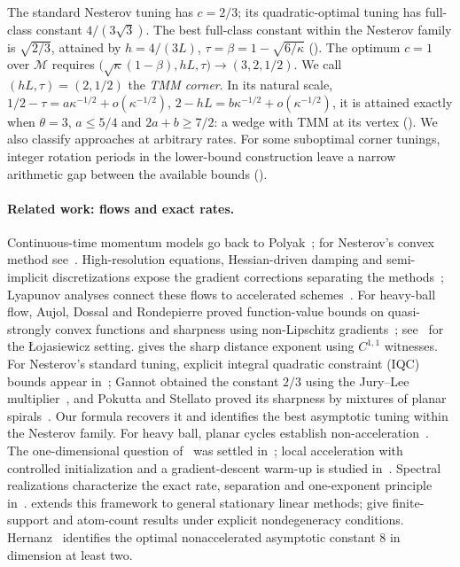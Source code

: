 \documentclass[11pt]{article}
\theoremstyle{definition}
\theoremstyle{remark}
\newcommand{\cM}{\mathcal M}
\begin{document}
The standard Nesterov tuning has \(c=2/3\); its quadratic-optimal tuning has
full-class constant \(4/(3\sqrt3)\).  The best full-class constant within the
Nesterov family is \(\sqrt{2/3}\), attained by
\(h=4/(3L)\), \(\tau=\beta=1-\sqrt{6/\kappa}\)
().
The optimum \(c=1\) over \(\cM\) requires
\(\bigl(\sqrt\kappa(1-\beta),hL,\tau\bigr)\to(3,2,1/2)\).
We call \((hL,\tau)=(2,1/2)\) the \emph{TMM corner}.  In its natural scale,
\(1/2-\tau=a\kappa^{-1/2}+o(\kappa^{-1/2})\),
\(2-hL=b\kappa^{-1/2}+o(\kappa^{-1/2})\), it is attained exactly when
\(\theta=3\), \(a\le5/4\) and \(2a+b\ge7/2\): a wedge with TMM at its
vertex ().  We also classify approaches at arbitrary rates.
For some suboptimal corner tunings, integer rotation periods in the lower-bound construction
leave a narrow arithmetic gap between the available bounds
().

\paragraph{Related work: flows and exact rates.}
Continuous-time momentum models go back to Polyak~\cite{Polyak1964};
for Nesterov's convex method see~\cite{SBC16}.  High-resolution equations,
Hessian-driven damping and semi-implicit discretizations expose the gradient
corrections separating the methods~\cite{SDJS22,ACFR22,MJ19}; Lyapunov analyses
connect these flows to accelerated schemes~\cite{SZ21,WRJ21}.
For heavy-ball flow, Aujol, Dossal and Rondepierre proved function-value
bounds on quasi-strongly convex functions and sharpness using non-Lipschitz
gradients~\cite{ADR22}; see~\cite{ADR23} for the \L ojasiewicz setting.
 gives the sharp distance exponent using \(C^{1,1}\) witnesses.
For Nesterov's standard tuning, explicit integral quadratic constraint (IQC)
bounds appear in~\cite{SJFB18};
Gannot obtained the constant \(2/3\) using the Jury--Lee multiplier~\cite{Gan22},
and Pokutta and Stellato proved its sharpness by mixtures of planar
spirals~\cite{PS26}.  Our formula recovers it and identifies the best
asymptotic tuning within the Nesterov family.
For heavy ball, planar cycles establish non-acceleration~\cite{GTD,GDT23}.
The one-dimensional question of~\cite{GTD25} was settled in~\cite{FHDA26};
local acceleration with controlled initialization and a gradient-descent
warm-up is studied in~\cite{LWS26}.  Spectral realizations characterize the
exact rate, separation and one-exponent principle in~\cite{TA}.
 extends this framework to general stationary linear methods;
 give finite-support and atom-count
results under explicit nondegeneracy conditions.
Hernanz~\cite{Her26} identifies the optimal nonaccelerated asymptotic
constant \(8\) in dimension at least two.
\end{document}
